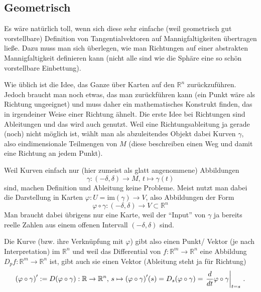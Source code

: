 \documentclass[../H_Analysis_main.tex]{subfiles}
\begin{document}
		\subsection{Geometrisch}
Es wäre natürlich toll, wenn sich diese sehr einfache (weil geometrisch gut vorstellbare) Definition von Tangentialvektoren auf Mannigfaltigkeiten übertragen ließe. Dazu muss man sich überlegen, wie man Richtungen auf einer abstrakten Mannigfaltigkeit definieren kann (nicht alle sind wie die Sphäre eine so schön vorstellbare Einbettung). 

Wie üblich ist die Idee, das Ganze über Karten auf den $\mathbb{R}^n$ zurückzuführen. Jedoch braucht man noch etwas, das man zurückführen kann (ein Punkt wäre als Richtung ungeeignet) und muss daher ein mathematisches Konstrukt finden, das in irgendeiner Weise einer Richtung ähnelt. Die erste Idee bei Richtungen sind Ableitungen und das wird auch genutzt. Weil eine Richtungsableitung ja gerade (noch) nicht möglich ist, wählt man als abzuleitendes Objekt dabei Kurven $\gamma$, also eindimensionale Teilmengen von $M$ (diese beschreiben einen Weg und damit eine Richtung an jedem Punkt).

Weil Kurven einfach nur (hier zumeist als glatt angenommene) Abbildungen
\begin{equation}
\gamma: (-\delta, \delta) \rightarrow M, \, t \mapsto \gamma(t)
\end{equation}
sind, machen Definition und Ableitung keine Probleme. Meist nutzt man dabei die Darstellung in Karten $\varphi: U = \text{im}(\gamma) \rightarrow V$, also Abbildungen der Form
\begin{equation}
\varphi \circ \gamma: (-\delta, \delta) \rightarrow V \subset \mathbb{R}^n
\end{equation}
Man braucht dabei übrigens nur eine Karte, weil der \enquote{Input} von $\gamma$ ja bereits reelle Zahlen aus einem offenen Intervall $(-\delta, \delta)$ sind.


Die Kurve (bzw. ihre Verknüpfung mit $\varphi$) gibt also einen Punkt/ Vektor (je nach Interpretation) im $\mathbb{R}^n$ und weil das Differential von $f: \mathbb{R}^m \rightarrow \mathbb{R}^n$ eine Abbildung $D_p f: \mathbb{R}^m \rightarrow \mathbb{R}^n$ ist, gibt auch sie einen Vektor (Ableitung steht ja für Richtung)
\begin{equation}
\qty(\varphi \circ \gamma)' := D\qty(\varphi \circ \gamma): \mathbb{R} \rightarrow \mathbb{R}^n, \, s \mapsto \qty(\varphi \circ \gamma)'(s) = D_s \qty(\varphi \circ \gamma) = \eval{\dv{t} \varphi \circ \gamma}_{t = s} \, .
\end{equation}
\end{document}
